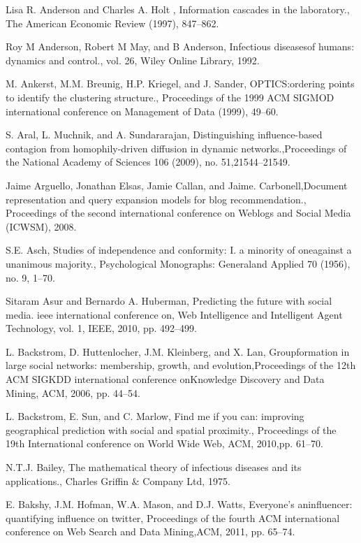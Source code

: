 \begin{thebibliography}{999}
 Lisa R. Anderson and Charles A. Holt , Information cascades in the laboratory., The American Economic Review (1997), 847–862.

 Roy M Anderson, Robert M May, and B Anderson, Infectious diseasesof humans: dynamics and control., vol. 26, Wiley Online Library, 1992.

 M. Ankerst, M.M. Breunig, H.P. Kriegel, and J. Sander, OPTICS:ordering points to identify the clustering structure., Proceedings of the 1999 ACM SIGMOD international conference on Management of Data (1999), 49–60.

 S. Aral, L. Muchnik, and A. Sundararajan, Distinguishing influence-based contagion from homophily-driven diffusion in dynamic networks.,Proceedings of the National Academy of Sciences 106 (2009), no. 51,21544–21549.

 Jaime Arguello, Jonathan Elsas, Jamie Callan, and Jaime. Carbonell,Document representation and query expansion models for blog recommendation., Proceedings of the second international conference on Weblogs and Social Media (ICWSM), 2008.

 S.E. Asch, Studies of independence and conformity: I. a minority of oneagainst a unanimous majority., Psychological Monographs: Generaland Applied 70 (1956), no. 9, 1–70.

 Sitaram Asur and Bernardo A. Huberman, Predicting the future with social media. ieee international conference on, Web Intelligence and Intelligent Agent Technology, vol. 1, IEEE, 2010, pp. 492–499.

 L. Backstrom, D. Huttenlocher, J.M. Kleinberg, and X. Lan, Groupformation in large social networks: membership, growth, and evolution,Proceedings of the 12th ACM SIGKDD international conference onKnowledge Discovery and Data Mining, ACM, 2006, pp. 44–54.

 L. Backstrom, E. Sun, and C. Marlow, Find me if you can: improving geographical prediction with social and spatial proximity., Proceedings of the 19th International conference on World Wide Web, ACM, 2010,pp. 61–70.

 N.T.J. Bailey, The mathematical theory of infectious diseases and its applications., Charles Griffin \& Company Ltd, 1975.

 E. Bakshy, J.M. Hofman, W.A. Mason, and D.J. Watts, Everyone’s aninfluencer: quantifying influence on twitter, Proceedings of the fourth ACM international conference on Web Search and Data Mining,ACM, 2011, pp. 65–74.


\end{thebibliography}
